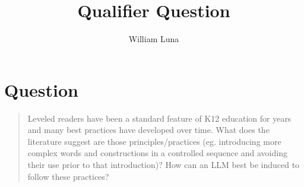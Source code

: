 \documentclass[
	letterpaper, %
]{jdf}
\author{William Luna}
\title{Qualifier Question}
\begin{document}

\maketitle




\section{Question}

\blockquote{Leveled readers have been a standard feature of K12 education for years and many best practices have developed over time.  What does the literature suggest are those principles/practices (eg. introducing more complex words and constructions in a controlled sequence and avoiding their use prior to that introduction)? How can an LLM best be induced to follow these practices?}
\end{document}
